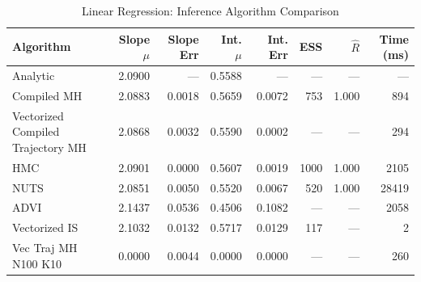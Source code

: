 \begin{table}[t]
\centering
\caption{Linear Regression: Inference Algorithm Comparison}
\label{tab:linreg}
\small
\begin{tabular}{lrrrrrrr}
\toprule
Algorithm & Slope $\mu$ & Slope Err & Int. $\mu$ & Int. Err & ESS & $\hat{R}$ & Time (ms) \\
\midrule
Analytic & 2.0900 & --- & 0.5588 & --- & --- & --- & --- \\
Compiled MH & 2.0883 & 0.0018 & 0.5659 & 0.0072 & 753 & 1.000 & 894 \\
Vectorized Compiled Trajectory MH & 2.0868 & 0.0032 & 0.5590 & 0.0002 & --- & --- & 294 \\
HMC & 2.0901 & 0.0000 & 0.5607 & 0.0019 & 1000 & 1.000 & 2105 \\
NUTS & 2.0851 & 0.0050 & 0.5520 & 0.0067 & 520 & 1.000 & 28419 \\
ADVI & 2.1437 & 0.0536 & 0.4506 & 0.1082 & --- & --- & 2058 \\
Vectorized IS & 2.1032 & 0.0132 & 0.5717 & 0.0129 & 117 & --- & 2 \\
Vec Traj MH N100 K10 & 0.0000 & 0.0044 & 0.0000 & 0.0000 & --- & --- & 260 \\
\bottomrule
\end{tabular}
\end{table}